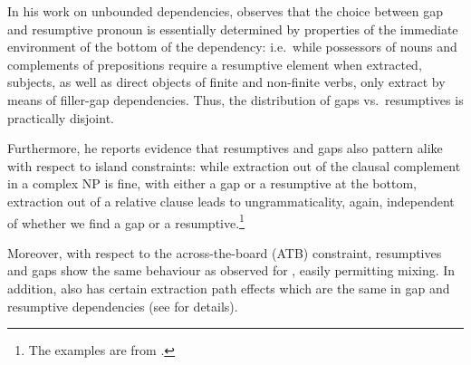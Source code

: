 \documentclass[output=paper,biblatex,babelshorthands,newtxmath,draftmode,colorlinks,citecolor=brown]{langscibook}
\begin{document}
In his work on  unbounded dependencies,
\citet{Borsley.2010} observes that the choice between gap and
resumptive pronoun is essentially determined by properties of the
immediate environment of the bottom of the dependency: i.e.\ while
possessors of nouns and complements of prepositions require a
resumptive element when extracted, subjects, as well as direct objects
of finite and non-finite verbs, only extract by means of filler-gap
dependencies. Thus, the distribution of gaps vs.\ resumptives is
practically disjoint.

Furthermore, he reports evidence that resumptives and gaps also
pattern alike with respect to island constraints: while extraction out
of the clausal complement in a complex NP is fine, with either a gap
or a resumptive at the bottom, extraction out of a relative clause leads to
ungrammaticality, again, independent of whether we find a gap or a
resumptive.\footnote{The examples are from \citet[91--92]{Borsley.2010}.}

\eal
{}
\zl

\noindent
Moreover, with respect to the across-the-board (ATB) constraint,
resumptives and gaps show the same behaviour as observed for ,
easily permitting mixing. In addition,  also has certain
extraction path effects which are the same in gap and resumptive
dependencies (see \citealp{Borsley.2010} for details).
\end{document}
